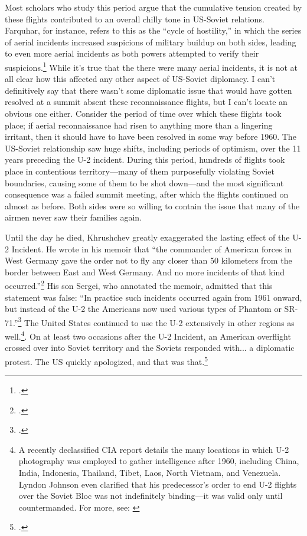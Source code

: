 \documentclass[14pt]{extarticle}
\begin{document}
Most scholars who study this period argue that the cumulative tension created by these flights contributed to an overall chilly tone in US-Soviet relations. Farquhar, for instance, refers to this as the \enquote{cycle of hostility,} in which the series of aerial incidents increased suspicions of military buildup on both sides, leading to even more aerial incidents as both powers attempted to verify their suspicions.\footcite[p.~43]{farquhar_aerial_2015} While it's true that the there were many aerial incidents, it is not at all clear how this affected any other aspect of US-Soviet diplomacy. I can't definitively say that there wasn't some diplomatic issue that would have gotten resolved at a summit absent these reconnaissance flights, but I can't locate an obvious one either. Consider the period of time over which these flights took place; if aerial reconnaissance had risen to anything more than a lingering irritant, then it should have to have been resolved in some way before 1960. The US-Soviet relationship saw huge shifts, including periods of optimism, over the 11 years preceding the U-2 incident. During this period, hundreds of flights took place in contentious territory---many of them purposefully violating Soviet boundaries, causing some of them to be shot down---and the most significant consequence was a failed summit meeting, after which the flights continued on almost as before. Both sides were so willing to contain the issue that many of the airmen never saw their families again.

Until the day he died, Khrushchev greatly exaggerated the lasting effect of the U-2 Incident. He wrote in his memoir that \enquote{the commander of American forces in West Germany gave the order not to fly any closer than 50 kilometers from the border between East and West Germany. And no more incidents of that kind occurred.}\footcite[p.~256]{khrushchev_memoirs_2007} His son Sergei, who annotated the memoir, admitted that this statement was false: \enquote{In practice such incidents occurred again from 1961 onward, but instead of the U-2 the Americans now used various types of Phantom or SR-71.}\footcite[p.~258]{khrushchev_memoirs_2007} The United States continued to use the U-2 extensively in other regions as well.\footnote{A recently declassified CIA report details the many locations in which U-2 photography was employed to gather intelligence after 1960, including China, India, Indonesia, Thailand, Tibet, Laos, North Vietnam, and Venezuela. Lyndon Johnson even clarified that his predecessor's order to end U-2 flights over the Soviet Bloc was not indefinitely binding---it was valid only until countermanded. For more, see: \cite[p.~195]{pedlow_central_1992}}. On at least two occasions after the U-2 Incident, an American overflight crossed over into Soviet territory and the Soviets responded with... a diplomatic protest. The US quickly apologized, and that was that.\footcite{orlov_u-2_2007}
\end{document}
